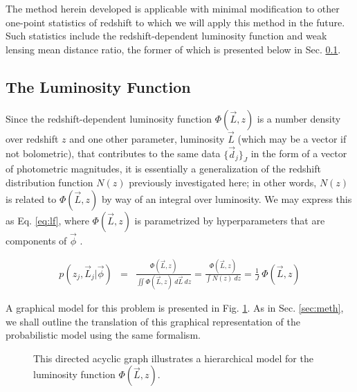 \documentclass[preprint]{aastex}
\begin{document}
The method herein developed is applicable with minimal modification to other 
one-point statistics of redshift to which we will apply this method in the 
future.  Such statistics include the redshift-dependent luminosity function and 
weak lensing mean distance ratio, the former of which is presented below in 
Sec. \ref{sec:lf}.

\clearpage
\subsection{The Luminosity Function}
\label{sec:lf}

Since the redshift-dependent luminosity function $\Phi(\vec{L},z)$ is a number 
density over redshift $z$ and one other parameter, luminosity $\vec{L}$ (which 
may be a vector if not bolometric), that contributes to the same data 
$\{\vec{d}_{j}\}_{J}$ in the form of a vector of photometric magnitudes, it is 
essentially a generalization of the redshift distribution function $N(z)$ 
previously investigated here; in other words, $N(z)$ is related to 
$\Phi(\vec{L},z)$ by way of an integral over luminosity.   We may express this 
as Eq. \ref{eq:lf}, where $\Phi(\vec{L},z)$ is parametrized by hyperparameters 
that are components of $\vec{\phi}$ .

\begin{eqnarray}
\label{eq:lf}
p(z_{j},\vec{L}_{j}|\vec{\phi}) &=& \frac{\Phi(\vec{L},z)}{\iint 
\Phi(\vec{L},z)\ d\vec{L}\ dz} = \frac{\Phi(\vec{L},z)}{\int N(z)\ dz} = 
\frac{1}{J}\ \Phi(\vec{L},z)
\end{eqnarray}

A graphical model for this problem is presented in Fig. \ref{fig:lf}.  As in 
Sec. \ref{sec:meth}, we shall outline the translation of this graphical 
representation of the probabilistic model using the same formalism.

\begin{figure}
\vspace{0.5cm}
\begin{center}
\caption{This directed acyclic graph illustrates a hierarchical model for the 
luminosity function $\Phi(\vec{L},z)$.}
\label{fig:lf}
\end{center}
\end{figure}
\end{document}
